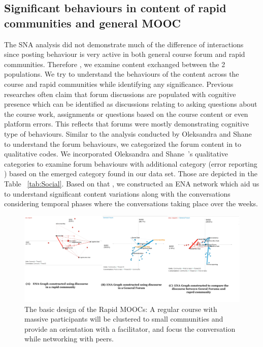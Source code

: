 \documentclass[manuscript,screen,review]{acmart}
\begin{document}
\subsection{Significant behaviours in content of rapid communities and general MOOC}

The SNA analysis did not demonstrate much of the difference of interactions since posting behaviour is very active in both general course forum and rapid communities. Therefore , we examine content exchanged between the 2 populations. We try to understand the behaviours of the content across the course and rapid communities while identifying any significance. Previous researches often claim that forum discussions are populated with cognitive presence which can be identified as discussions relating to asking questions about the course work, assignments or questions based on the course content or even platform errors. This reflects that forums were mostly demonstrating cognitive type of behaviours. Similar to the analysis conducted by Oleksandra and Shane~\cite{oleksandra2016untangling} to understand the forum behaviours, we categorized the forum content in to qualitative codes. We incorporated  Oleksandra and Shane~\cite{oleksandra2016untangling}'s qualitative categories to examine forum behaviours with additional category (error reporting ) based on the emerged category found in our data set. Those are depicted in the Table ~\ref{tab:Social}. Based on that , we constructed an ENA network which aid us to understand significant content variations along with the conversations considering temporal phases where the conversations taking place over the weeks. 

\begin{figure}[h]
  \centering
  \includegraphics[width=\linewidth]{images/ENA Diagrams.png}
  \caption{The basic design of the Rapid MOOCs: A regular course with massive participants will be clustered to small communities and provide an orientation with a facilitator, and focus the conversation while networking with peers.}
 \label{fig:ENADiagrams}
\end{figure}
\end{document}
